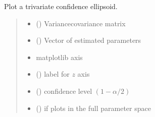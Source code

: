 \documentclass[letterpaper,10pt,english]{sphinxmanual}
\begin{document}
\begin{fulllineitems}
\label{\detokenize{cubmods:cubmods.general.plot_ellipsoid}}
\pysigstartsignatures
{}
\pysigstopsignatures
\sphinxAtStartPar
Plot a trivariate confidence ellipsoid.
\begin{quote}\begin{description}
\begin{itemize}
\item {} 
\sphinxAtStartPar
{} () \textendash{} Variance\sphinxhyphen{}covariance matrix

\item {} 
\sphinxAtStartPar
{} () \textendash{} Vector of estimated parameters

\item {} 
\sphinxAtStartPar
{} \textendash{} matplotlib axis

\item {} 
\sphinxAtStartPar
{} () \textendash{} label for \(z\) axis

\item {} 
\sphinxAtStartPar
{} () \textendash{} confidence level \((1 - \alpha/2)\)

\item {} 
\sphinxAtStartPar
{} () \textendash{} if  plots in the full parameter space

\end{itemize}

\end{description}\end{quote}

\end{fulllineitems}
\end{document}
